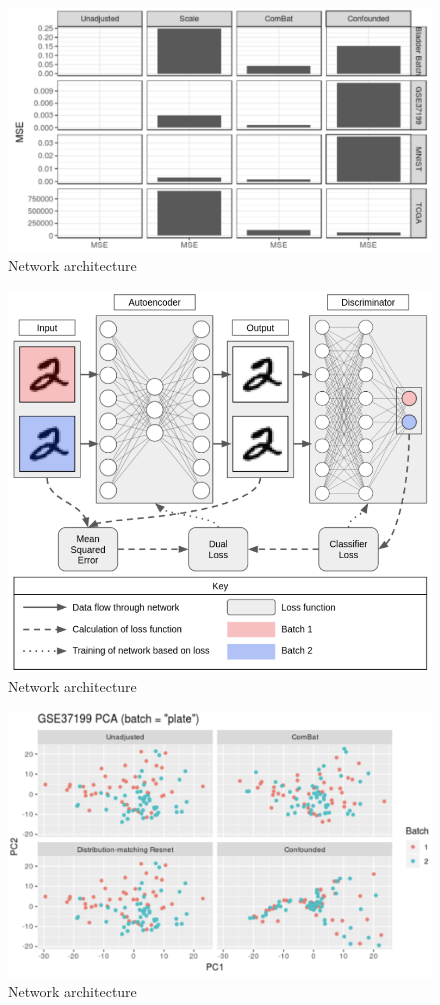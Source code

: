 \documentclass[notitlepage]{article}
\begin{document}
\begin{figure}
	\centering
	\includegraphics[width=4.5in]{figures/rough/mse}
	\caption{Network architecture}
	\label{simulationfigure}
\end{figure}
\begin{figure}
	\centering
	\includegraphics[width=4.5in]{figures/rough/network}
	\caption{Network architecture}
	\label{simulationfigure}
\end{figure}
\begin{figure}
	\centering
	\includegraphics[width=4.5in]{figures/rough/pca}
	\caption{Network architecture}
	\label{simulationfigure}
\end{figure}
\end{document}
